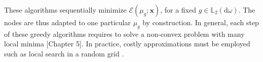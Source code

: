 \documentclass[twoside,11pt]{book}
\numberwithin{theorem}{chapter}
\numberwithin{definition}{chapter}
\numberwithin{proposition}{chapter}
\numberwithin{corollary}{chapter}
\numberwithin{example}{chapter}
\numberwithin{lemma}{chapter}
\numberwithin{assumption}{chapter}
\numberwithin{equation}{chapter}
\numberwithin{figure}{chapter}
\DeclareMathOperator{\F}{\mathcal{F}}
\DeclareMathOperator{\X}{\mathcal{X}}
\def\Ltwo{\mathbb{L}_{2}(\mathrm{d} \omega)}
\newcommand{\pc}[1]{\textcolor{blue}{#1}}
\begin{document}
These algorithms sequentially minimize $\mathcal{E}(\mu_{g}; \bm{x})$, for a fixed $g \in \Ltwo$. The nodes are thus adapted to one particular $\mu_{g}$ by construction.
%
In general, each step of these greedy algorithms requires to solve a non-convex problem with many local minima \citep{Oett17}[Chapter 5]. In practice, costly approximations must be employed such as local search in a random grid \citep{LaLiBa15}.%

\end{document}
